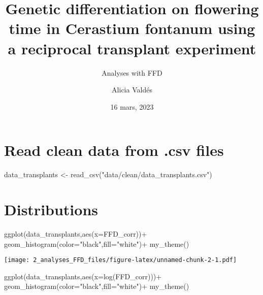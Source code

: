 \documentclass[
]{article}
\title{Genetic differentiation on flowering time in Cerastium fontanum
using a reciprocal transplant experiment}
\subtitle{Analyses with FFD}
\author{Alicia Valdés}
\date{16 mars, 2023}
\newenvironment{Shaded}{\begin{snugshade}}{\end{snugshade}}
\newcommand{\AttributeTok}[1]{\textcolor[rgb]{0.77,0.63,0.00}{#1}}
\newcommand{\FunctionTok}[1]{\textcolor[rgb]{0.00,0.00,0.00}{#1}}
\newcommand{\NormalTok}[1]{#1}
\newcommand{\OtherTok}[1]{\textcolor[rgb]{0.56,0.35,0.01}{#1}}
\newcommand{\SpecialCharTok}[1]{\textcolor[rgb]{0.00,0.00,0.00}{#1}}
\newcommand{\StringTok}[1]{\textcolor[rgb]{0.31,0.60,0.02}{#1}}
\begin{document}
\maketitle

{
\setcounter{tocdepth}{4}
\tableofcontents
}
\hypertarget{read-clean-data-from-.csv-files}{%
\section{Read clean data from .csv
files}\label{read-clean-data-from-.csv-files}}

\begin{Shaded}
\begin{Highlighting}[]
\NormalTok{data\_transplants }\OtherTok{\textless{}{-}} \FunctionTok{read\_csv}\NormalTok{(}\StringTok{"data/clean/data\_transplants.csv"}\NormalTok{)}
\end{Highlighting}
\end{Shaded}

\hypertarget{distributions}{%
\section{Distributions}\label{distributions}}

\begin{Shaded}
\begin{Highlighting}[]
\FunctionTok{ggplot}\NormalTok{(data\_transplants,}\FunctionTok{aes}\NormalTok{(}\AttributeTok{x=}\NormalTok{FFD\_corr))}\SpecialCharTok{+}
  \FunctionTok{geom\_histogram}\NormalTok{(}\AttributeTok{color=}\StringTok{"black"}\NormalTok{,}\AttributeTok{fill=}\StringTok{"white"}\NormalTok{)}\SpecialCharTok{+}
  \FunctionTok{my\_theme}\NormalTok{()}
\end{Highlighting}
\end{Shaded}

\texttt{[image: 2\_analyses\_FFD\_files/figure-latex/unnamed-chunk-2-1.pdf]}

\begin{Shaded}
\begin{Highlighting}[]
\FunctionTok{ggplot}\NormalTok{(data\_transplants,}\FunctionTok{aes}\NormalTok{(}\AttributeTok{x=}\FunctionTok{log}\NormalTok{(FFD\_corr)))}\SpecialCharTok{+}
  \FunctionTok{geom\_histogram}\NormalTok{(}\AttributeTok{color=}\StringTok{"black"}\NormalTok{,}\AttributeTok{fill=}\StringTok{"white"}\NormalTok{)}\SpecialCharTok{+}
  \FunctionTok{my\_theme}\NormalTok{()}
\end{Highlighting}
\end{Shaded}
\end{document}
